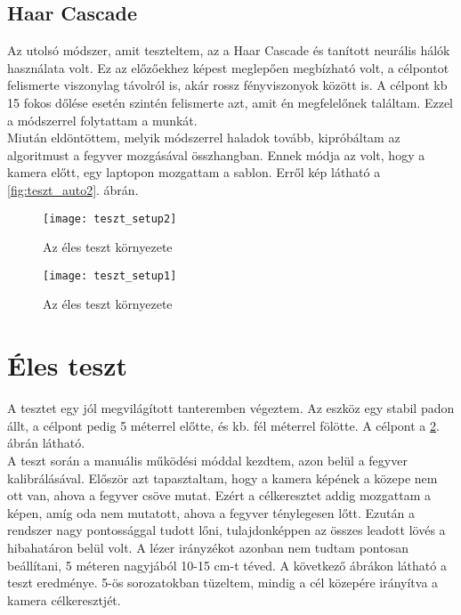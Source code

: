 \subsection*{Haar Cascade}
Az utolsó módszer, amit teszteltem, az a Haar Cascade és tanított neurális hálók használata volt. Ez az előzőekhez képest meglepően megbízható volt, a célpontot felismerte viszonylag távolról is, akár rossz fényviszonyok között is. A célpont kb 15 fokos dőlése esetén szintén felismerte azt, amit én megfelelőnek találtam. Ezzel a módszerrel folytattam a munkát. \\

Miután eldöntöttem, melyik módszerrel haladok tovább, kipróbáltam az algoritmust a fegyver mozgásával összhangban. Ennek módja az volt, hogy a kamera előtt, egy laptopon mozgattam a sablon. Erről kép látható a \ref{fig:teszt_auto2}. ábrán.

\pagebreak

\begin{figure}[h!]
	\centering
	\texttt{[image: teszt\_setup2]}
	\caption{Az éles teszt környezete}
	\label{fig:teszt_teszt_setup1}
\end{figure}

\begin{figure}[h!]
	\centering
	\texttt{[image: teszt\_setup1]}
	\caption{Az éles teszt környezete}
	\label{fig:teszt_teszt_setup2}
\end{figure}

\pagebreak

\section{Éles teszt}
A tesztet egy jól megvilágított tanteremben végeztem. Az eszköz egy stabil padon állt, a célpont pedig 5 méterrel előtte, és kb. fél méterrel fölötte. A célpont a \ref{fig:teszt_teszt_setup2}. ábrán látható.\\

A teszt során a manuális működési móddal kezdtem, azon belül a fegyver kalibrálásával. Először azt tapasztaltam, hogy a kamera képének a közepe nem ott van, ahova a fegyver csöve mutat. Ezért a célkeresztet addig mozgattam a képen, amíg oda nem mutatott, ahova a fegyver ténylegesen lőtt. Ezután a rendszer nagy pontossággal tudott lőni, tulajdonképpen az összes leadott lövés a hibahatáron belül volt. A lézer irányzékot azonban nem tudtam pontosan beállítani, 5 méteren nagyjából 10-15 cm-t téved. A következő ábrákon látható a teszt eredménye. 5-ös sorozatokban tüzeltem, mindig a cél közepére irányítva a kamera célkeresztjét. \\


